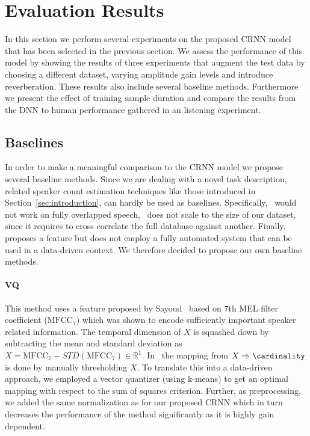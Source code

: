 \section{Evaluation Results}%
\label{sec:evaluation}
In this section we perform several experiments on the proposed CRNN model that has been selected in the previous section.
We assess the performance of this model by showing the results of three experiments that augment the test data by
choosing a different dataset, varying amplitude gain levels and introduce reverberation.
These results also include several baseline methods.
Furthermore we present the effect of training sample duration and compare the results from the DNN to human performance gathered in an listening experiment.

\subsection{Baselines}%
\label{ssec:baselines}
In order to make a meaningful comparison to the CRNN model we propose several baseline methods.
Since we are dealing with a novel task description, related speaker count estimation techniques like those introduced in Section~\ref{sec:introduction}, can hardly be used as baselines.
Specifically,~\cite{xu13} would not work on fully overlapped speech,~\cite{andrei15_interspeech} does not scale to the size of our dataset, since it requires to cross correlate the full database against another.
Finally,~\cite{sayoud10} proposes a feature but does not employ a fully automated system that can be used in a data-driven context.
We therefore decided to propose our own baseline methods.

\paragraph*{\textbf{VQ}}
This method uses a feature proposed by Sayoud~\cite{sayoud10} based on 7th MEL filter coefficient (\(\mbox{MFCC}_7\)) which was shown to encode sufficiently important speaker related information.
The temporal dimension of \(X\) is squashed down by subtracting the mean and standard deviation as \(X = \overline{\mbox{MFCC}_7} - STD(\mbox{MFCC}_7) \in \mathbb{R}^{1}\).
In~\cite{sayoud10} the mapping from \(X \Rightarrow \cardinality \) is done by manually thresholding \(X\).
To translate this into a data-driven approach, we employed a vector quantizer (using k-means) to get an optimal mapping with respect to the sum of squares criterion.
Further, as preprocessing, we added the same normalization as for our proposed CRNN which in turn decreases the performance of the method significantly as it is highly gain dependent.

